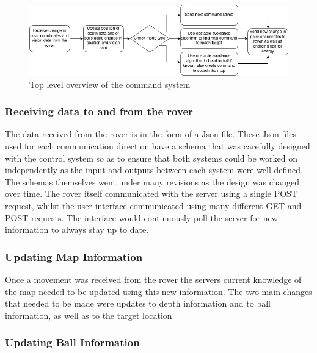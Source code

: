 \documentclass[10pt,twoside]{article}
\begin{document}
\begin{figure}[hbt]
    \centering
    \includegraphics[scale = 0.6]{CommandOverview.jpg}
    \caption{Top level overview of the command system}
    \label{fig:CommandOverview}
\end{figure}

\subsubsection{Receiving data to and from the rover}
The data received from the rover is in the form of a Json file. These Json files used for each communication direction have a schema that was carefully designed with the control system so as to ensure that both systems could be worked on independently as the input and outputs between each system were well defined. The schemas themselves went under many revisions as the design was changed over time. The rover itself communicated with the server using a single POST request, whilst the user interface communicated using many different GET and POST requests. The interface would continuously poll the server for new information to always stay up to date.

\subsubsection{Updating Map Information}
Once a movement was received from the rover the servers current knowledge of the map needed to be updated using this new information. The two main changes that needed to be made were updates to depth information and to ball information, as well as to the target location.

\subsubsection{Updating Ball Information}
\end{document}
